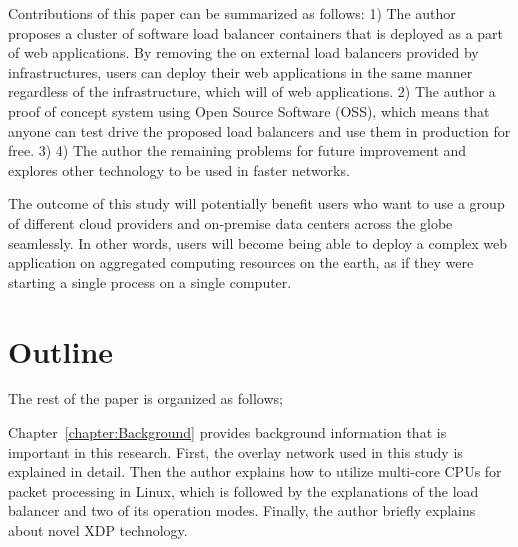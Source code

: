Contributions of this paper can be summarized as follows:
1) The author proposes a cluster of software load balancer containers that is deployed as a part of web applications.
By removing the  on external load balancers provided by infrastructures, users can deploy their web applications in the same manner regardless of the infrastructure, which will  of web applications.
2) The author  a proof of concept system using Open Source Software (OSS), which means that anyone can test drive the proposed load balancers and use them in production for free.
3) 
4) The author  the remaining problems for future improvement and explores other technology to be used in faster networks.

The outcome of this study will potentially benefit users who want to use a group of different cloud providers and on-premise data centers across the globe seamlessly.
In other words, users will become being able to deploy a complex web application on aggregated computing resources on the earth, as if they were starting a single process on a single computer.

\section{Outline}


The rest of the paper is organized as follows;

Chapter~\ref{chapter:Background} provides background information that is important in this research.
First, the overlay network used in this study is explained in detail.
Then the author explains how to utilize multi-core CPUs for packet processing in Linux,
which is followed by the explanations of the  load balancer and two of its operation modes.
Finally, the author briefly explains about novel XDP technology.

